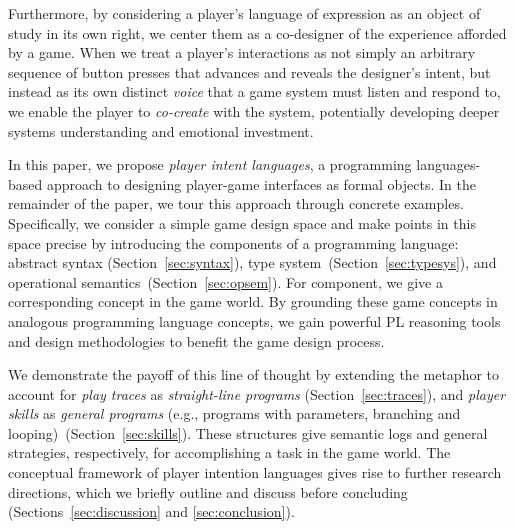 \documentclass[sigconf]{acmart}
\begin{document}

%
%


Furthermore, by considering a player's language of expression as an object
of study in its own right, we center them as a co-designer of the experience
afforded by a game. When we treat a player's interactions as not simply an
arbitrary sequence of button presses that advances and reveals the
designer's intent, but instead as its own distinct {\em voice} that a game
system must listen and respond to, we enable the player to {\em co-create}
with the system, potentially developing deeper systems understanding
and emotional investment.

In this paper, we propose \emph{player intent languages}, a
programming languages-based approach to designing player-game
interfaces as formal objects.
%
In the remainder of the paper, we tour this approach through concrete
examples.
%
Specifically, we consider a simple game design space and make points
in this space precise by introducing the components of a programming
language:
%
abstract syntax (Section~\ref{sec:syntax}),
%
type system~(Section~\ref{sec:typesys}), 
%
and operational semantics~(Section~\ref{sec:opsem}).
%
For component, we give a corresponding concept in the game world.
%
By grounding these game concepts in analogous programming language
concepts, we gain powerful PL reasoning tools and design methodologies
to benefit the game design process.

We demonstrate the payoff of this line of thought by extending the
metaphor to account for \emph{play traces} as \emph{straight-line
  programs} (Section~\ref{sec:traces}), and {\em player skills} as
\emph{general programs} (e.g., programs with parameters, branching and
looping)~(Section~\ref{sec:skills}).
%
These structures give semantic logs and general strategies,
respectively, for accomplishing a task in the game world.
%
The conceptual framework of player intention languages gives rise to
further research directions, which we briefly outline and discuss
before concluding (Sections~\ref{sec:discussion} and \ref{sec:conclusion}).
\end{document}
